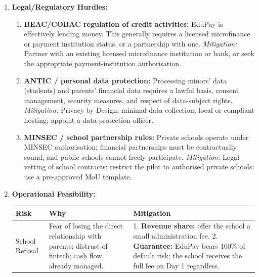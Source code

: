 \documentclass[11pt]{article}
\begin{document}
\begin{exoresolu}
\begin{enumerate}
\begin{align*}
    \text{Net Result (Year 1)} &= -30\text{M} - 50\text{M} - 13.3\text{M} \approx \mathbf{-93.3 \text{ Million FCFA}}
    \end{align*}
    \textbf{Analysis:} A Year 1 loss is common (customer acquisition, default provisioning), but here the \emph{gross margin itself is negative}, which is structural. Break-even requires adjustments: lower default rate ($<3\%$), higher margin, cheaper funds, or greater scale. \emph{Not viable at the current parameters without changes.}
    \item \textbf{Legal/Regulatory Hurdles:}
    \begin{enumerate}
        \item \textbf{BEAC/COBAC regulation of credit activities:} EduPay is effectively lending money. This generally requires a licensed microfinance or payment institution status, or a partnership with one. \emph{Mitigation:} Partner with an existing licensed microfinance institution or bank, or seek the appropriate payment-institution authorisation.
        \item \textbf{ANTIC / personal data protection:} Processing minors' data (students) and parents' financial data requires a lawful basis, consent management, security measures, and respect of data-subject rights. \emph{Mitigation:} Privacy by Design; minimal data collection; local or compliant hosting; appoint a data-protection officer.
        \item \textbf{MINSEC / school partnership rules:} Private schools operate under MINSEC authorisation; financial partnerships must be contractually sound, and public schools cannot freely participate. \emph{Mitigation:} Legal vetting of school contracts; restrict the pilot to authorised private schools; use a pre-approved MoU template.
    \end{enumerate}
    \item \textbf{Operational Feasibility:}
    \begin{center}
    \begin{tabularx}{\linewidth}{|l|X|X|}\hline
    \rowcolor{popblueL} \textbf{Risk} & \textbf{Why} & \textbf{Mitigation} \\ \hline
    School Refusal & Fear of losing the direct relationship with parents; distrust of fintech; cash flow already managed. & 1. \textbf{Revenue share:} offer the school a small administration fee. 2. \textbf{Guarantee:} EduPay bears 100\% of default risk; the school receives the full fee on Day 1 regardless. \\ \hline

\end{tabularx}
\end{center}
\end{enumerate}
\end{exoresolu}
\end{document}
